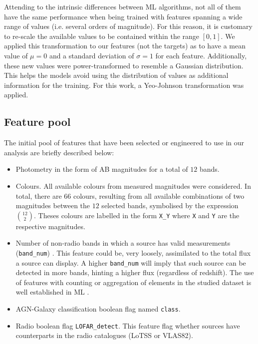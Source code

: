 \documentclass{aa}
\begin{document}
Attending to the intrinsic differences between ML algorithms, not all of them have the same performance when being trained with features spanning a wide range of values (i.e. several orders of magnitude). For this reason, it is customary to re-scale the available values to be contained within the range $[0, 1]$. We applied this transformation to our features (not the targets) as to have a mean value of $\mu = 0$ and a standard deviation of $\sigma = 1$ for each feature. Additionally, these new values were power-transformed to resemble a Gaussian distribution. This helps the models avoid using the distribution of values as additional information for the training. For this work, a Yeo-Johnson transformation \citep{10.1093/biomet/87.4.954} was applied.


\subsection{Feature pool}\label{sec:feature_creation}


The initial pool of features that have been selected or engineered to use in our analysis are briefly described below:

\begin{itemize}
    \item Photometry in the form of AB magnitudes for a total of $12$ bands.
    
    \item Colours. All available colours from measured magnitudes were considered. In total, there are $66$ colours, resulting from all available combinations of two magnitudes between the $12$ selected bands, symbolised by the expression $\binom{12}{2}$. Theses colours are labelled in the form \verb|X_Y| where \verb|X| and \verb|Y| are the respective magnitudes.

    \item Number of non-radio bands in which a source has valid measurements (\verb|band_num|) . This feature could be, very loosely, assimilated to the total flux a source can display. A higher \verb|band_num| will imply that such source can be detected in more bands, hinting a higher flux (regardless of redshift). The use of features with counting or aggregation of elements in the studied dataset is well established in ML \citep[see, for example,][]{zheng2018feature, duboue2020art}.
    
    \item AGN-Galaxy classification boolean flag named \verb|class|.
    \item Radio boolean flag \verb|LOFAR_detect|. This feature flag whether sources have counterparts in the radio catalogues (LoTSS or VLAS82).
\end{itemize}
\end{document}
